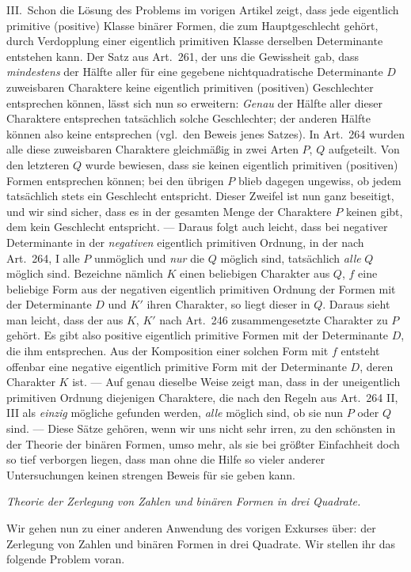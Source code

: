 III.\ Schon die Lösung des Problems im vorigen Artikel zeigt, dass
jede eigentlich primitive (positive) Klasse binärer Formen, die zum
Hauptgeschlecht gehört, durch Verdopplung einer eigentlich primitiven
Klasse derselben Determinante entstehen kann. Der Satz aus Art.\ 261,
der uns die Gewissheit gab, dass \textit{mindestens} der Hälfte aller
für eine gegebene nichtquadratische Determinante
$D$ zuweisbaren Charaktere keine eigentlich primitiven (positiven)
Geschlechter entsprechen können, lässt sich nun so erweitern: \textit{Genau}
der Hälfte aller dieser Charaktere entsprechen tatsächlich solche
Geschlechter; der anderen Hälfte können also keine entsprechen (vgl.\
den Beweis jenes Satzes). In Art.\ 264 wurden alle diese zuweisbaren
Charaktere gleichmäßig in zwei Arten $P$, $Q$ aufgeteilt.
Von den letzteren $Q$ wurde bewiesen, dass sie keinen eigentlich
primitiven (positiven) Formen entsprechen können; bei den übrigen
$P$ blieb dagegen ungewiss, ob jedem tatsächlich stets ein Geschlecht
entspricht. Dieser Zweifel ist nun ganz beseitigt, und wir sind sicher,
dass es in der gesamten Menge der Charaktere $P$ keinen gibt,
dem kein Geschlecht entspricht. --- Daraus folgt auch leicht, dass
bei negativer Determinante in der \textit{negativen} eigentlich primitiven
Ordnung, in der nach Art.\ 264, I alle $P$ unmöglich und \textit{nur}
die $Q$ möglich sind, tatsächlich \textit{alle} $Q$ möglich
sind. Bezeichne nämlich $K$ einen beliebigen Charakter aus $Q$,
$f$ eine beliebige Form aus der negativen eigentlich primitiven
Ordnung der Formen mit der Determinante $D$ und $K'$ ihren
Charakter, so liegt dieser in $Q$. Daraus sieht man leicht, dass
der aus $K$, $K'$ nach Art.\ 246 zusammengesetzte Charakter
zu $P$ gehört. Es gibt also positive eigentlich primitive Formen
mit der Determinante $D$, die ihm entsprechen. Aus der Komposition
einer solchen Form mit $f$ entsteht offenbar eine negative eigentlich
primitive Form mit der Determinante $D$, deren Charakter $K$
ist. --- Auf genau dieselbe Weise zeigt man, dass in der uneigentlich
primitiven Ordnung diejenigen Charaktere, die nach den Regeln aus
Art.\ 264 II, III als \textit{einzig} mögliche gefunden werden,
\textit{alle} möglich sind, ob sie nun $P$ oder $Q$ sind.
--- Diese Sätze gehören, wenn wir uns nicht sehr irren, zu den schönsten
in der Theorie der binären Formen, umso mehr, als sie bei größter
Einfachheit doch so tief verborgen liegen, dass man ohne die Hilfe so
vieler anderer Untersuchungen keinen strengen Beweis für sie geben kann.

\begin{center}
\textit{Theorie der Zerlegung von Zahlen und binären Formen in drei Quadrate.}
\end{center}
Wir gehen nun zu einer anderen Anwendung des vorigen Exkurses über:
der Zerlegung von Zahlen und binären Formen in drei Quadrate. Wir
stellen ihr das folgende Problem voran.

